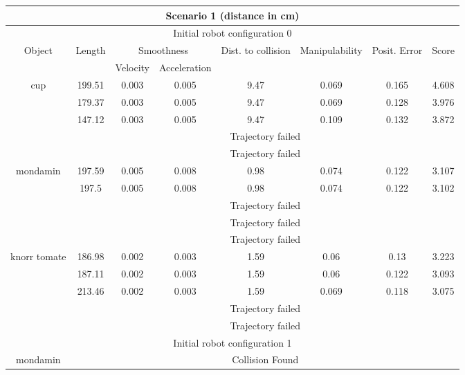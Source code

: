 {\small
\begin{center}
\begin{longtable}[c]{ | c | c | c | c | c | c | c || c || }
\hline
\hline
\multicolumn{8}{|c|}{Scenario 1 (distance in cm)} \\
\hline
\hline
\multicolumn{8}{|c|}{Initial robot configuration 0} \\
\hline
\multirow{2}{*}{Object} & \multirow{2}{*}{Length} & \multicolumn{2}{c|}{Smoothness} & \multirow{2}{1.5cm}{Dist. to collision} &\multirow{2}{*}{Manipulability} & \multirow{2}{1.3cm}{Posit. Error} & \multirow{2}{*}{Score}\\
& & Velocity & Acceleration & & & \\
\hline
\multirow{5}{1.5cm}{cup}& 199.51 & 0.003 & 0.005 & 9.47 & 0.069 & 0.165 & 4.608 \\ 
& 179.37 & 0.003 & 0.005 & 9.47 & 0.069 & 0.128 & 3.976 \\ 
& 147.12 & 0.003 & 0.005 & 9.47 & 0.109 & 0.132 & 3.872 \\ 
& \multicolumn{7}{c|}{Trajectory failed} \\ 
& \multicolumn{7}{c|}{Trajectory failed} \\ 
\hline 
\multirow{5}{1.5cm}{mondamin}& 197.59 & 0.005 & 0.008 & 0.98 & 0.074 & 0.122 & 3.107 \\
& 197.5 & 0.005 & 0.008 & 0.98 & 0.074 & 0.122 & 3.102 \\ 
& \multicolumn{7}{c|}{Trajectory failed} \\ 
& \multicolumn{7}{c|}{Trajectory failed} \\ 
& \multicolumn{7}{c|}{Trajectory failed} \\ 
\hline 
\multirow{5}{1.5cm}{knorr tomate}& 186.98 & 0.002 & 0.003 & 1.59 & 0.06 & 0.13 & 3.223 \\ 
& 187.11 & 0.002 & 0.003 & 1.59 & 0.06 & 0.122 & 3.093 \\ 
& 213.46 & 0.002 & 0.003 & 1.59 & 0.069 & 0.118 & 3.075 \\ 
& \multicolumn{7}{c|}{Trajectory failed} \\ 
& \multicolumn{7}{c|}{Trajectory failed} \\ 
\hline 
\multicolumn{8}{|c|}{Initial robot configuration 1} \\
\hline
\multirow{5}{1.5cm}{mondamin}& \multicolumn{7}{c|}{Collision Found} \\ 

\end{longtable}
\end{center}}
